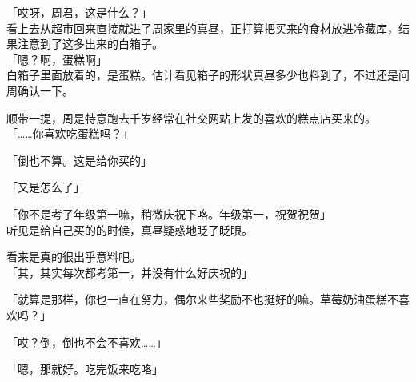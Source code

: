 「哎呀，周君，这是什么？」\\

看上去从超市回来直接就进了周家里的真昼，正打算把买来的食材放进冷藏库，结果注意到了这多出来的白箱子。\\

「嗯？啊，蛋糕啊」\\

白箱子里面放着的，是蛋糕。估计看见箱子的形状真昼多少也料到了，不过还是问周确认一下。

顺带一提，周是特意跑去千岁经常在社交网站上发的喜欢的糕点店买来的。\\

「……你喜欢吃蛋糕吗？」

「倒也不算。这是给你买的」

「又是怎么了」

「你不是考了年级第一嘛，稍微庆祝下咯。年级第一，祝贺祝贺」\\

听见是给自己买的的时候，真昼疑惑地眨了眨眼。

看来是真的很出乎意料吧。\\

「其，其实每次都考第一，并没有什么好庆祝的」

「就算是那样，你也一直在努力，偶尔来些奖励不也挺好的嘛。草莓奶油蛋糕不喜欢吗？」

「哎？倒，倒也不会不喜欢……」

「嗯，那就好。吃完饭来吃咯」\\

